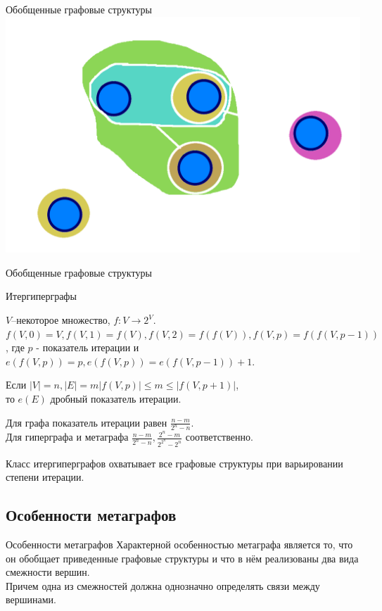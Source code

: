 \documentclass{beamer}
\begin{document}
\begin{darkframes}
\begin{frame}[label=lists]{Обобщенные графовые структуры}
			\centering
				\includegraphics[scale=0.1]{resources/mg}
	\end{frame}

	\begin{frame}[label=lists]{Обобщенные графовые структуры}
	 	\begin{block}{Итергиперграфы}\centering \small{
	 		$V$--некоторое множество, $f:V \to 2^V$.
		\\$f(V,0) = V, f(V,1) = f(V), f(V,2) = f(f(V)), f(V,p) = f(f(V, p-1))$,
	 		где $p$ - показатель итерации и $e(f(V,p))=p, e(f(V,p)) = e(f(V,p-1))+1$.

	 		Если  $|V|=n, |E|=m |f(V,p)| \leq m \leq |f(V,p+1)|$,\\ то $e(E)$ дробный показатель итерации.}
	 	\end{block}
	 		Для графа показатель итерации равен $\frac{n-m}{2^n-n}$.\\Для гиперграфа и метаграфа $\frac{n-m}{2^n-n}, \frac{2^n-m}{2^{2^n}-2^n}$ соответственно.
	 		
	 		\justifying
	 		Класс итергиперграфов охватывает все графовые структуры при варьировании степени итерации.
	\end{frame}

		\subsection{Особенности метаграфов}

	\begin{frame}[label=lists]{Особенности метаграфов}
	\centering
	 	Характерной особенностью метаграфа является то, что он обобщает приведенные графовые структуры и что в нём реализованы \alert{два вида смежности} вершин.\\ Причем одна из смежностей должна однозначно определять связи между вершинами.



\end{frame}
\end{darkframes}
\end{document}
